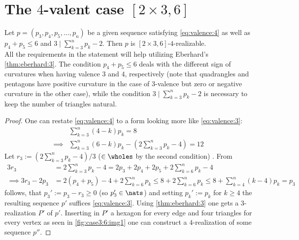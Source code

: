 \section{The $4$-valent case $[2 \times 3, 6]$}
\begin{lemma}\label{thm:case3:6:mainlemma}
  Let $p = (p_3, p_4, p_5, \dots, p_n)$ be a given sequence satisfying \autoref{eq:valence:4} as well as $p_4 + p_5 \leq 6$ and $3 \mid \sum_{k=3}^{n} p_k - 2$. Then $p$ is $[2 \times 3, 6]$-$4$-realizable.\\

  All the requirements in the statement will help utilizing Eberhard's \autoref{thm:eberhard:3}. The condition $p_4 + p_5 \leq 6$ deals with the different sign of curvatures when having valence $3$ and $4$, respectively (note that quadrangles and pentagons have positive curvature in the case of $3$-valence but zero or negative curvature in the other case), while the condition $3 \mid \sum_{k=3}^{n} p_k - 2$ is necessary to keep the number of triangles natural.
  \begin{proof}
    One can restate \autoref{eq:valence:4} to a form looking more like \autoref{eq:valence:3}:
    \begin{align*}
      & \sum_{k=3}^n \left( 4 - k \right) p_k = 8 \\
      \implies & \sum_{k=3}^n \left( 6 - k \right) p_k - \left(2 \sum_{k=3}^n  p_k - 4 \right) = 12
    \end{align*}
    Let $r_3 := (2 \sum_{k=3}^{n} p_k - 4)/3$ ($\in \wholes$ by the second condition) . From
    \begin{align*}
      3 r_3 &= 2 \sum_{k=3}^{n} p_k - 4 =  2 p_3 + 2 p_4 + 2 p_5 + 2 \sum_{k=6}^{n} p_k - 4\\
      \implies 3 r_3 - 2 p_3 &= 2(p_4 + p_5) - 4 + 2 \sum_{k=6}^{n} p_k \leq 8 + 2 \sum_{k=6}^{n} p_k \leq 8 + \sum_{k=4}^{n} (k - 4) p_k = p_3
    \end{align*}
    follows, that $p_3' := p_3 - r_3 \geq 0$ (so $p'_3 \in \nats$) and setting $p_k' := p_k$ for $k \geq 4$ the resulting sequence $p'$ suffices \autoref{eq:valence:3}. Using \autoref{thm:eberhard:3} one gets a $3$-realization $P'$ of $p'$. Inserting in $P'$ a hexagon for every edge and four triangles for every vertex as seen in \autoref{fig:case3:6:img1} one can construct a $4$-realization of some sequence $p''$.


\end{proof}
\end{lemma}
